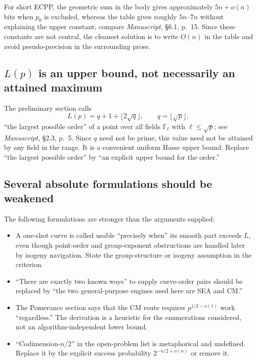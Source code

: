 \documentclass[11pt]{amsart}
\newcommand{\F}{\mathbb{F}}
\newcommand{\sourceat}[2]{\emph{Manuscript}, \S#1, p.~#2}
\begin{document}
For short ECPP, the geometric sum in the body gives approximately $5n+o(n)$ bits when $p_0$ is excluded, whereas the table gives roughly $5n$--$7n$ without explaining the upper constant; compare \sourceat{6.1}{15}.  Since these constants are not central, the cleanest solution is to write $O(n)$ in the table and avoid pseudo-precision in the surrounding prose.

\subsection{\texorpdfstring{$L(p)$}{L(p)} is an upper bound, not necessarily an attained maximum}

The preliminary section calls
\[
 L(p)=q+1+\lfloor2\sqrt q\rfloor,
 \qquad q=\lfloor\sqrt p\rfloor,
\]
``the largest possible order'' of a point over all fields $\F_\ell$ with $\ell\le\sqrt p$; see \sourceat{2.3}{5}.  Since $q$ need not be prime, this value need not be attained by any field in the range.  It is a convenient uniform Hasse upper bound.  Replace ``the largest possible order'' by ``an explicit upper bound for the order.''

\subsection{Several absolute formulations should be weakened}

The following formulations are stronger than the arguments supplied:

\begin{itemize}
\item A one-shot curve is called usable ``precisely when'' its smooth part exceeds $L$, even though point-order and group-exponent obstructions are handled later by isogeny navigation.  State the group-structure or isogeny assumption in the criterion.
\item ``There are exactly two known ways'' to supply curve-order pairs should be replaced by ``the two general-purpose engines used here are SEA and CM.''
\item The Pomerance section says that the CM route requires $p^{1/2-o(1)}$ work ``regardless.''  The derivation is a heuristic for the enumerations considered, not an algorithm-independent lower bound.
\item ``Codimension-$n/2$'' in the open-problem list is metaphorical and undefined.  Replace it by the explicit success probability $2^{-n/2+o(n)}$ or remove it.
\end{itemize}
\end{document}
